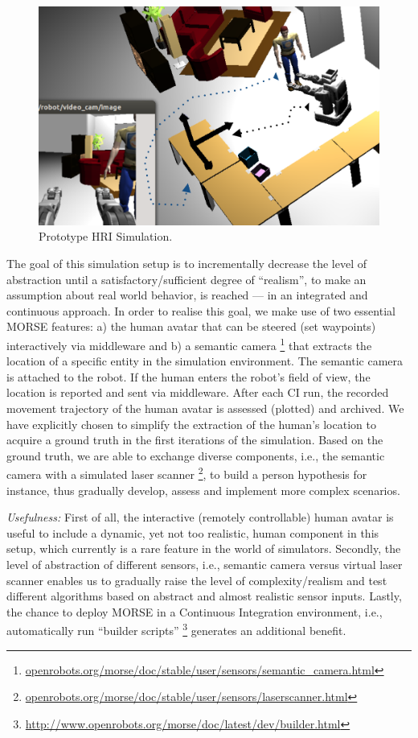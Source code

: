 \documentclass[conference]{IEEEtran}
\begin{document}
\begin{figure}[H]
      \centering
      \includegraphics[width=0.9\linewidth]{proto-setup.png}
      \caption{Prototype HRI Simulation.}
      \label{fig|proto}
\end{figure}

The goal of this simulation setup is to incrementally decrease the level of
abstraction until a satisfactory/sufficient degree of ``realism'', to make an
assumption about real world behavior, is reached --- in an integrated and
continuous approach. In order to realise this goal, we make use of two essential
MORSE features: a) the human avatar that can be steered (set waypoints)
interactively via middleware and b) a semantic camera
\footnote{\url{openrobots.org/morse/doc/stable/user/sensors/semantic_camera.html}}
that extracts the location of a specific entity in the simulation environment.
The semantic camera is attached to the robot. If the human enters the robot's
field of view, the location is reported and sent via middleware. After each CI
run, the recorded movement trajectory of the human avatar is assessed (plotted)
and archived. 
We have explicitly chosen to simplify the extraction of the
human's location to acquire a ground truth in the first iterations of the
simulation. Based on the ground truth, we are able to exchange diverse
components, i.e., the semantic camera with a simulated laser scanner
\footnote{\url{openrobots.org/morse/doc/stable/user/sensors/laserscanner.html}},
to build a person hypothesis for instance, thus gradually develop, assess and
implement more complex scenarios. 

\emph{Usefulness:} First of all, the interactive (remotely controllable) human avatar 
is useful to include a dynamic, yet not too realistic, human component in this 
setup, which currently is a rare feature in the world of simulators. Secondly, 
the level of abstraction of different sensors, i.e., semantic camera versus virtual 
laser scanner enables us to gradually raise the level of complexity/realism and 
test different algorithms based on abstract and almost realistic sensor inputs. 
Lastly, the chance to deploy MORSE in a Continuous Integration environment, i.e., 
automatically run ``builder scripts'' \footnote{\url{http://www.openrobots.org/morse/doc/latest/dev/builder.html}}
generates an additional benefit.
 
\end{document}
